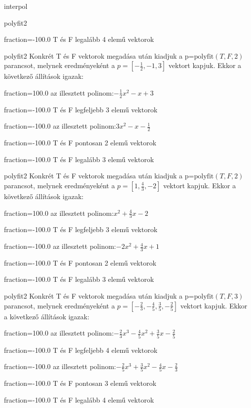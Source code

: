 \documentclass[12pt]{article}
\begin{document}
\begin{quiz}{interpol}
\begin{multi}[multiple]{polyfit2}
\item[fraction=-100.0] T és F legalább 4 elemű vektorok
\end{multi}
\begin{multi}[multiple]{polyfit2}
Konkrét T és F vektorok megadása után kiadjuk a p=$\mathrm{polyfit}(T,F,2)$
parancsot, melynek eredményeként a $p=\left[-\frac{1}{2},-1,3\right]$ vektort kapjuk.
Ekkor a következő állítások igazak:
\item[fraction=100.0] az illesztett polinom:$-\frac{1}{2}x^2-x+3$
\item[fraction=-100.0]  T és F legfeljebb 3 elemű vektorok
\item[fraction=-100.0]  az illesztett polinom:$3x^2-x-\frac{1}{2}$
\item[fraction=-100.0]  T és F pontosan 2 elemű vektorok
\item[fraction=-100.0] T és F legalább 3 elemű vektorok
\end{multi}
\begin{multi}[multiple]{polyfit2}
Konkrét T és F vektorok megadása után kiadjuk a p=$\mathrm{polyfit}(T,F,2)$
parancsot, melynek eredményeként a $p=\left[1,\frac{4}{3},-2\right]$ vektort kapjuk.
Ekkor a következő állítások igazak:
\item[fraction=100.0] az illesztett polinom:$x^2+\frac{4}{3}x-2$
\item[fraction=-100.0]  T és F legfeljebb 3 elemű vektorok
\item[fraction=-100.0]  az illesztett polinom:$-2x^2+\frac{4}{3}x+1$
\item[fraction=-100.0]  T és F pontosan 2 elemű vektorok
\item[fraction=-100.0] T és F legalább 3 elemű vektorok
\end{multi}
\begin{multi}[multiple]{polyfit2}
Konkrét T és F vektorok megadása után kiadjuk a p=$\mathrm{polyfit}(T,F,3)$
parancsot, melynek eredményeként a $p=\left[-\frac{2}{3},-\frac{4}{5},\frac{3}{5},-\frac{2}{5}\right]$ vektort kapjuk.
Ekkor a következő állítások igazak:
\item[fraction=100.0] az illesztett polinom:$-\frac{2}{3}x^3-\frac{4}{5}x^2+\frac{3}{5}x-\frac{2}{5}$
\item[fraction=-100.0]  T és F legfeljebb 4 elemű vektorok
\item[fraction=-100.0]  az illesztett polinom:$-\frac{2}{5}x^3+\frac{3}{5}x^2-\frac{4}{5}x-\frac{2}{3}$
\item[fraction=-100.0]  T és F pontosan 3 elemű vektorok
\item[fraction=-100.0] T és F legalább 4 elemű vektorok

\end{multi}
\end{quiz}
\end{document}
